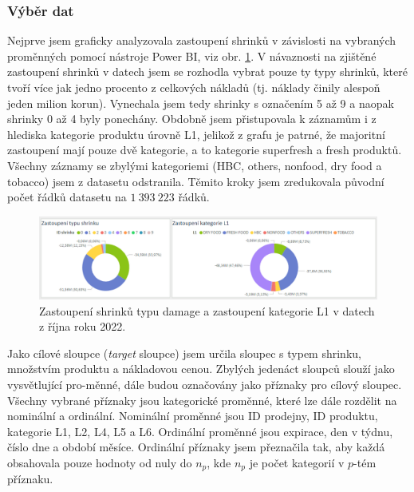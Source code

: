 
\subsubsection{Výběr dat}

Nejprve jsem graficky analyzovala zastoupení shrinků v závislosti na vybraných proměnných pomocí nástroje Power BI, viz obr. \ref*{obr:rok:g:zastoupeni1}. V návaznosti na zjištěné zastoupení shrinků v datech jsem se rozhodla vybrat pouze ty typy shrinků, které tvoří více jak jedno procento z celkových nákladů (tj. náklady činily alespoň jeden milion korun). Vynechala jsem tedy shrinky s označením 5 až 9 a naopak shrinky 0 až 4 byly ponechány. Obdobně jsem přistupovala k záznamům i z hlediska kategorie produktu úrovně L1, jelikož z grafu je patrné, že majoritní zastoupení mají pouze dvě kategorie, a to kategorie superfresh a fresh produktů. Všechny záznamy se zbylými kategoriemi (HBC, others, nonfood, dry food a tobacco) jsem z datasetu odstranila. Těmito kroky jsem zredukovala původní počet řádků datasetu na $1\ 393\ 223$ řádků.

\begin{figure}[hbtp!]
    \centering
    \captionsetup{justification=centering}
    \includegraphics[width=\textwidth]{obrazky/grafy/zastoupeni1.png}
    \caption{Zastoupení shrinků typu damage a zastoupení kategorie L1 v datech \\ z října roku 2022.}
    \label{obr:rok:g:zastoupeni1}
\end{figure}

Jako cílové sloupce (\emph{target} sloupce) jsem určila sloupec s typem shrinku, množstvím produktu a nákladovou cenou. Zbylých jedenáct sloupců slouží jako vysvětlující pro-\linebreak měnné, dále budou označovány jako příznaky pro cílový sloupec. Všechny vybrané příznaky jsou kategorické proměnné, které lze dále rozdělit na nominální a ordinální. Nominální proměnné jsou ID prodejny, ID produktu, kategorie L1, L2, L4, L5 a L6. Ordinální proměnné jsou expirace, den v týdnu, číslo dne a období měsíce. Ordinální příznaky jsem přeznačila tak, aby každá obsahovala pouze hodnoty od nuly do $n_p$, kde $n_p$ je počet kategorií v $p$-tém příznaku. 

